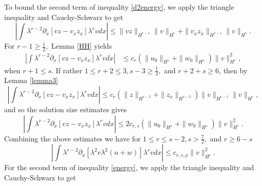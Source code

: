 \documentclass[reqno]{amsart}
\theoremstyle{plain}
\numberwithin{equation}{section}
\begin{document}
To bound the second term of inequality \eqref{d2energy}, we apply the triangle inequality and Cauchy-Schwarz to get
\begin{equation}\label{F}
    \left| \int \lambda^{r-2}\partial_x\left[vz - v_xz_x\right]\lambda^{r}vdx\right| 
        \leq \|vz\|_{H^{r-1}}\|v\|_{H^{r}}
            + \|v_xz_x\|_{H^{r-1}}\|v\|_{H^{r}} .
\end{equation}
For $r - 1 \geq \frac12,$ Lemma \ref{HH} yields 
\begin{align}
    \left| \int \lambda^{r-2}\partial_x\left[vz - v_xz_x\right]\lambda^{r}vdx\right|
         &\leq c_r(\|u_0\|_{H^s} + \|w_0\|_{H^s})\|v\|^2_{H^r},
\end{align} 
when $r+1 \leq s$.
If rather $1 \leq r + 2 \leq 3, s - 3 \geq \frac12,$ and $r + 2 + s \geq 6$, then by Lemma \ref{lemma3} 
\begin{equation}
    \left| \int \lambda^{r-2}\partial_x\left[vz - v_xz_x\right]\lambda^{r}vdx\right|
        \leq c_r(\|z\|_{H^{s-3}}+ \|z_x\|_{H^{s-3}})\|v\|_{H^{r-1}}\|v\|_{H^{r}} ,
\end{equation}
and so the solution size estimates gives 
    \[\left| \int \lambda^{r-2}\partial_x\left[vz - v_xz_x\right]\lambda^{r}vdx\right|
        \leq 2c_{r,s}(\|u_0\|_{H^s} + \|w_0\|_{H^s})\|v\|^2_{H^r}.\]
Combining the above estimates we have for $1 \leq r \leq s-2, s > \frac72,$ and $r \geq 6-s$
\begin{equation}\label{1stterm}
    \left| \int \lambda^{r-2}\partial_x\left[\lambda^2v\lambda^2(u+w)\right] \lambda^{r}vdx\right| \leq c_{r,s,\rho}\|v\|^2_{H^r}.
\end{equation}
For the second term of inequality \eqref{energy}, we apply the triangle inequality and Cauchy-Schwarz to get
 
\end{document}

